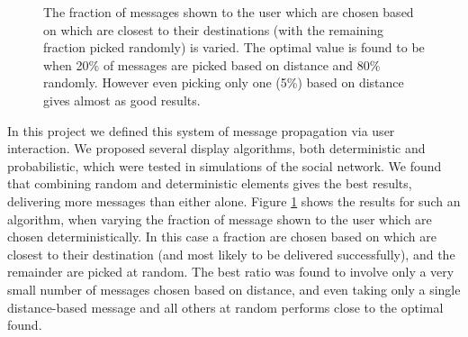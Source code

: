 \documentclass[bsc,frontabs,twoside,singlespacing,parskip,deptreport]{infthesis}     %
\begin{document}
\begin{figure}
\centering
{}
\caption{The fraction of messages shown to the user which are chosen based on which are closest to their destinations (with the remaining fraction picked randomly) is varied. The optimal value is found to be when 20\% of messages are picked based on distance and 80\% randomly. However even picking only one (5\%) based on distance gives almost as good results.}
\label{fig:distance_priority_fraction_intro}
\end{figure}

In this project we defined this system of message propagation via user interaction. We proposed several display algorithms, both deterministic and probabilistic, which were tested in simulations of the social network. We found that combining random and deterministic elements gives the best results, delivering more messages than either alone. Figure \ref{fig:distance_priority_fraction_intro} shows the results for such an algorithm, when varying the fraction of message shown to the user which are chosen deterministically. In this case a fraction are chosen based on which are closest to their destination (and most likely to be delivered successfully), and the remainder are picked at random. The best ratio was found to involve only a very small number of messages chosen based on distance, and even taking only a single distance-based message and all others at random performs close to the optimal found.
\end{document}

